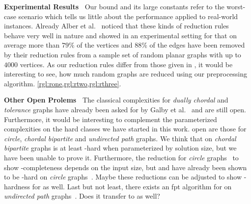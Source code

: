 \noindent \textbf{Experimental Results~}
Our bound and its large constants refer to the worst-case scenario which tells us little about the performance applied to real-world instances.
Already Alber et al.~\cite{Alber2004} noticed that these kinds of reduction rules behave very well in nature and showed in an experimental setting for \pdom that on average more than $79\%$ of the vertices and $88\%$ of the edges have been removed by their reduction rules from a sample set of random planar graphs with up to $4000$ vertices. 
As our reduction rules differ from those given in \cite{Alber2004}, it would be interesting to see, how much random graphs are reduced using our preprocessing algorithm. \cref{rgl:rone,rgl:rtwo,rgl:rthree}.

\noindent \textbf{Other Open Prolems~}
The classical complexities for \textit{dually chordal} and \textit{tolerance} graphs have already been asked for by Galby et al.~\cite{Galby2020} and are still open.
Furthermore, it would be interesting to complement the parameterized complexities on the hard classes we have started in this work.
open are those for \textit{circle}, \textit{chordal bipartite} and \textit{undirected path} graphs.
We think that \sdoms on \textit{chordal bipartite} graphs is at least \WONEhs-hard when parameterized by solution size, but we have been unable to prove it.
Furthermore, the reduction for \textit{circle} graphs~\cite{Kloks2021} to show \NP-completeness depends on the input size, but \doms and \tdoms have already been shown to be \WONEhs-hard on \textit{circle} graphs~\cite{Bousquet2012}. 
Maybe these reductions can be adjusted to show \WONEhs-hardness for \sdoms as well.
Last but not least, there exists an fpt algorithm for \doms on \textit{undirected path} graphs~\cite{Figueiredo2022}. 
Does it transfer to \sdoms as well?